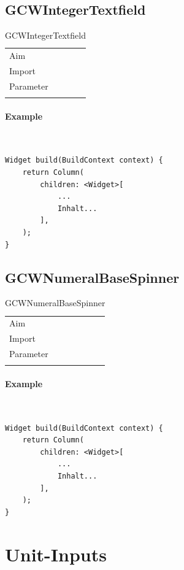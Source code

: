 \newpage
\subsection{GCWIntegerTextfield}
\begin{table}[H]
\begin{tabular}[h]{p{2cm}p{9cm}}
    \caption{GCWIntegerTextfield}
    Aim       & \\
    Import    & \\
    Parameter & \\
    \label{tab:GCWIntegerTextfield}
\end{tabular}
\end{table}
\paragraph*{Example} \,
\begin{lstlisting}
Widget build(BuildContext context) {
    return Column(
        children: <Widget>[
            ...
            Inhalt...
        ],
    );
}
\end{lstlisting}
\label{fig: ExampleGCWIntegerTextfield}

\newpage
\subsection{GCWNumeralBaseSpinner}
\begin{table}[H]
\begin{tabular}[h]{p{2cm}p{9cm}}
    \caption{GCWNumeralBaseSpinner}
    Aim       & \\
    Import    & \\
    Parameter & \\
    \label{tab:GCWNumeralBaseSpinner}
\end{tabular}
\end{table}
\paragraph*{Example} \,
\begin{lstlisting}
Widget build(BuildContext context) {
    return Column(
        children: <Widget>[
            ...
            Inhalt...
        ],
    );
}
\end{lstlisting}
\label{fig: ExampleGCWNumeralBaseSpinner}

\newpage
\section{Unit-Inputs}
